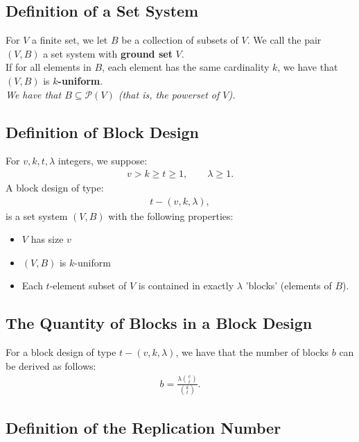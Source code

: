 \documentclass[a4paper, 12pt, twoside]{article}
\begin{document}
\subsection{Definition of a Set System}

For $V$ a finite set, we let $B$ be a collection of subsets of $V$.
We call the pair $(V, B)$ a set system with \textbf{ground set} $V$.
\\[\baselineskip]
If for all elements in $B$, each element has the same cardinality $k$,
we have that $(V, B)$ is \textbf{$k$-uniform}.  
\\[\baselineskip]
\textit{We have that $B \subseteq \mathcal{P}(V)$ (that is, the 
powerset of $V$).}
 
\subsection{Definition of Block Design} For $v, k, t, \lambda$ integers,
we suppose: \begin{gather*}
  v > k \geq t \geq 1, \qquad \lambda \geq 1.
\end{gather*} A block design of type: \begin{gather*}
  t-(v, k, \lambda),
\end{gather*} is a set system $(V, B)$ with the following properties:
\begin{itemize}
  \item $V$ has size $v$
  \item $(V, B)$ is $k$-uniform
  \item Each $t$-element subset of $V$ is contained in exactly
  $\lambda$ 'blocks' (elements of $B$).
\end{itemize}

\subsection{The Quantity of Blocks in a Block Design}

For a block design of type $t-(v,k,\lambda)$, we have that the number
of blocks $b$ can be derived as follows: \begin{gather*}
  b = \frac{\lambda{v \choose t}}{{k \choose t}}.
\end{gather*}

\subsection{Definition of the Replication Number}
\end{document}
